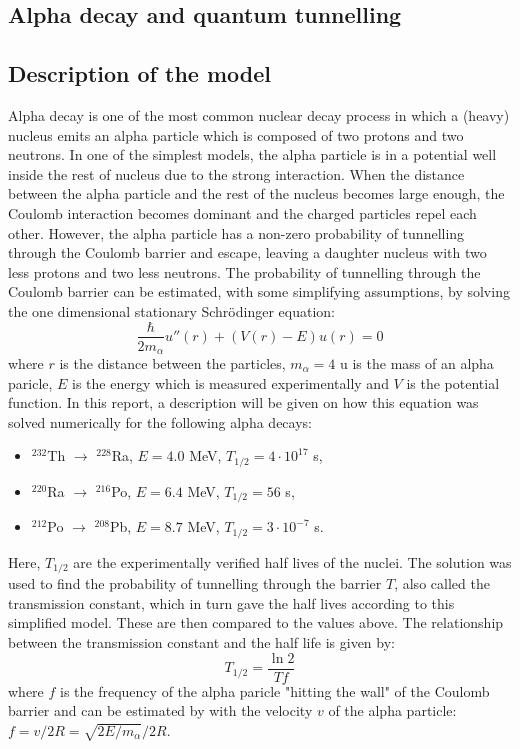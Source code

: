 \documentclass[twocolumn]{article}
\begin{document}
\begin{large}
\section*{Alpha decay and quantum tunnelling}
\subsection*{Description of the model}
Alpha decay is one of the most common nuclear decay process in which a (heavy) nucleus emits an alpha particle which is composed of two protons and two neutrons. In one of the simplest models, the alpha particle is in a potential well inside the rest of nucleus due to the strong interaction. When the distance between the alpha particle and the rest of the nucleus becomes large enough, the Coulomb interaction becomes dominant and the charged particles repel each other. However, the alpha particle has a non-zero probability of tunnelling through the Coulomb barrier and escape, leaving a daughter nucleus with two less protons and two less neutrons. The probability of tunnelling through the Coulomb barrier can be estimated, with some simplifying assumptions, by solving the one dimensional stationary Schrödinger equation:
\begin{equation}
    \label{26mar1229}
    \frac{\hbar}{2m_\alpha}u''(r) + (V(r)-E)u(r) = 0
\end{equation}
where $r$ is the distance between the particles, $m_\alpha=4$ u is the mass of an alpha paricle, $E$ is the energy which is measured experimentally and $V$ is the potential function. In this report, a description will be given on how this equation was solved numerically for the following alpha decays: 
\begin{itemize}
    \item[] $^{232}$Th $\to$ $^{228}$Ra, $E = 4.0$ MeV, $T_{1/2} = 4\cdot 10^{17}$ s,
    \item[] $^{220}$Ra $\to$ $^{216}$Po, $E = 6.4$ MeV, $T_{1/2} = 56$ s,
    \item[] $^{212}$Po $\to$ $^{208}$Pb, $E = 8.7$ MeV, $T_{1/2} = 3\cdot 10^{-7}$ s.
\end{itemize}
Here, $T_{1/2}$ are the experimentally verified half lives of the nuclei. The solution was used to find the probability of tunnelling through the barrier $T$, also called the transmission constant, which in turn gave the half lives according to this simplified model. These are then compared to the values above. The relationship between the transmission constant and the half life is given by:
\begin{equation}
    \label{28mar2156}
    T_{1/2} = \frac{\ln 2}{Tf}
\end{equation}
where $f$ is the frequency of the alpha paricle "hitting the wall" of the Coulomb barrier and can be estimated by with the velocity $v$ of the alpha particle: $f = v/2R = \sqrt{2E/m_\alpha}/2R$. 


\end{large}
\end{document}
